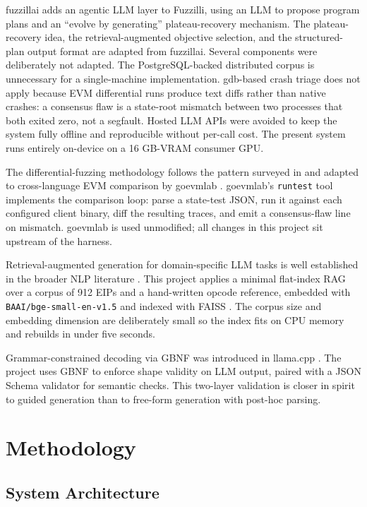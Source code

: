 \documentclass[conference]{IEEEtran}
\begin{document}
fuzzillai \cite{fuzzillai} adds an agentic LLM layer to Fuzzilli, using an LLM to propose program plans and an ``evolve by generating'' plateau-recovery mechanism. The plateau-recovery idea, the retrieval-augmented objective selection, and the structured-plan output format are adapted from fuzzillai. Several components were deliberately not adapted. The PostgreSQL-backed distributed corpus is unnecessary for a single-machine implementation. gdb-based crash triage does not apply because EVM differential runs produce text diffs rather than native crashes: a consensus flaw is a state-root mismatch between two processes that both exited zero, not a segfault. Hosted LLM APIs were avoided to keep the system fully offline and reproducible without per-call cost. The present system runs entirely on-device on a 16 GB-VRAM consumer GPU.

The differential-fuzzing methodology follows the pattern surveyed in \cite{differential} and adapted to cross-language EVM comparison by goevmlab \cite{goevmlab}. goevmlab's \texttt{runtest} tool implements the comparison loop: parse a state-test JSON, run it against each configured client binary, diff the resulting traces, and emit a consensus-flaw line on mismatch. goevmlab is used unmodified; all changes in this project sit upstream of the harness.

Retrieval-augmented generation for domain-specific LLM tasks is well established in the broader NLP literature \cite{rag}. This project applies a minimal flat-index RAG over a corpus of 912 EIPs and a hand-written opcode reference, embedded with \texttt{BAAI/bge-small-en-v1.5} \cite{bge} and indexed with FAISS \cite{faiss}. The corpus size and embedding dimension are deliberately small so the index fits on CPU memory and rebuilds in under five seconds.

Grammar-constrained decoding via GBNF was introduced in llama.cpp \cite{llamacpp}. The project uses GBNF to enforce shape validity on LLM output, paired with a JSON Schema validator for semantic checks. This two-layer validation is closer in spirit to guided generation \cite{guidance} than to free-form generation with post-hoc parsing.

\section{Methodology}

\subsection{System Architecture}
\end{document}
